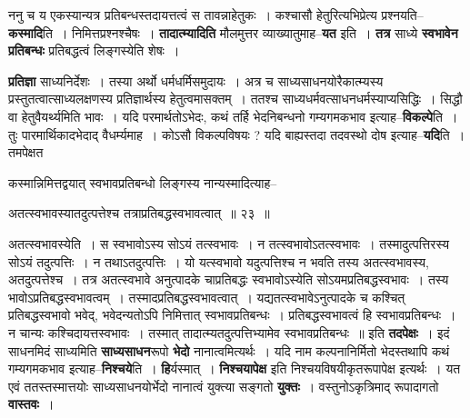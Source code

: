 \documentclass[article,12pt,a4paper]{memoir}
\begin{document}
	  \pstart ननु च य एकस्यान्यत्र प्रतिबन्धस्तदायत्तत्वं स तावन्नाहेतुकः । कश्चासौ हेतुरित्यभिप्रेत्य प्रश्नयति--\textbf{कस्मादि}ति । निमित्तप्रश्नश्चैषः । \textbf{तादात्म्यादिति} मौलमुत्तर व्याख्यातुमाह--\textbf{यत} इति । \textbf{तत्र} साध्ये \textbf{स्वभावेन प्रतिबन्धः} प्रतिबद्धत्वं लिङ्गस्येति शेषः ।
	\pend
      

	  \pstart \textbf{प्रतिज्ञा} साध्यनिर्देशः । तस्या अर्थो धर्मधर्मिसमुदायः । अत्र च साध्यसाधनयोरैकात्म्यस्य प्रस्तुतत्वात्साध्यलक्षणस्य प्रतिज्ञार्थस्य हेतुत्वमासक्तम् । ततश्च साध्यधर्मवत्साधनधर्मस्याप्यसिद्धिः । सिद्धौ वा हेतुवैयर्थ्यमिति भावः । यदि परमार्थतोऽभेदः, कथं तर्हि भेदनिबन्धनो गम्यगमकभाव इत्याह--\textbf{विकल्पे}ति । तुः पारमार्थिकादभेदाद् वैधर्म्यमाह । कोऽसौ विकल्पविषयः ? यदि बाह्यस्तदा तदवस्थो दोष इत्याह--\textbf{यदि}ति । तमपेक्षत  \leavevmode{} 
	  
	कस्मान्निमित्तद्वयात् स्वभावप्रतिबन्धो लिङ्गस्य नान्यस्मादित्याह--  
	  
	अतत्स्वभावस्यातदुत्पत्तेश्च तत्राप्रतिबद्धस्वभावत्वात् ॥ २३ ॥ 
	  
	अतत्स्वभावस्येति । स स्वभावोऽस्य सोऽयं तत्स्वभावः । न तत्स्वभावोऽतत्स्वभावः । तस्मादुत्पत्तिरस्य सोऽयं तदुत्पत्तिः । न तथाऽतदुत्पत्तिः । यो यत्स्वभावो यदुत्पत्तिश्च न भवति तस्य अतत्स्वभावस्य, अतदुत्पत्तेश्च । तत्र अतत्स्वभावे अनुत्पादके चाप्रतिबद्धः स्वभावोऽस्येति सोऽयमप्रतिबद्धस्वभावः । तस्य भावोऽप्रतिबद्धस्वभावत्वम् । तस्मादप्रतिबद्धस्वभावत्वात् । यद्यतत्स्वभावेऽनुत्पादके च कश्चित् प्रतिबद्धस्वभावो भवेद्, भवेदन्यतोऽपि निमित्तात् स्वभावप्रतिबन्धः । प्रतिबद्धस्वभावत्वं हि स्वभावप्रतिबन्धः । न चान्यः कश्चिदायत्तस्वभावः । तस्मात् तादात्म्यतदुत्पत्तिभ्यामेव स्वभावप्रतिबन्धः ॥ इति \textbf{तदपेक्षः} । इदं साधनमिदं साध्यमिति \textbf{साध्यसाधन}रूपो \textbf{भेदो} नानात्वमित्यर्थः । यदि नाम कल्पनानिर्मितो भेदस्तथापि कथं गम्यगमकभाव इत्याह--\textbf{निश्चये}ति । \textbf{हि}र्यस्मात् । \textbf{निश्चयापेक्ष} इति निश्चयविषयीकृतरूपापेक्ष इत्यर्थः । यत एवं ततस्तस्मात्तयोः साध्यसाधनयोर्भेदो नानात्वं युक्त्या सङ्गतो \textbf{युक्तः} । वस्तुनोऽकृत्रिमाद् रूपादागतो \textbf{वास्तवः} ।
	\pend
      
\end{document}
